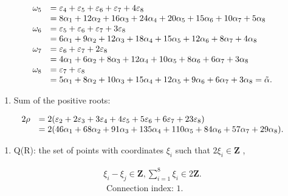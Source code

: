\[
\begin{array}{r l} \omega_ {5} & = \varepsilon_ {4} + \varepsilon_ {5} + \varepsilon_ {6} + \varepsilon_ {7} + 4 \varepsilon_ {8} \\ & = 8 \alpha_ {1} + 12 \alpha_ {2} + 16 \alpha_ {3} + 24 \alpha_ {4} + 20 \alpha_ {5} + 15 \alpha_ {6} + 10 \alpha_ {7} + 5 \alpha_ {8} \\ \omega_ {6} & = \varepsilon_ {5} + \varepsilon_ {6} + \varepsilon_ {7} + 3 \varepsilon_ {8} \\ & = 6 \alpha_ {1} + 9 \alpha_ {2} + 12 \alpha_ {3} + 18 \alpha_ {4} + 15 \alpha_ {5} + 12 \alpha_ {6} + 8 \alpha_ {7} + 4 \alpha_ {8} \\ \omega_ {7} & = \varepsilon_ {6} + \varepsilon_ {7} + 2 \varepsilon_ {8} \\ & = 4 \alpha_ {1} + 6 \alpha_ {2} + 8 \alpha_ {3} + 12 \alpha_ {4} + 10 \alpha_ {5} + 8 \alpha_ {6} + 6 \alpha_ {7} + 3 \alpha_ {8} \\ \omega_ {8} & = \varepsilon_ {7} + \varepsilon_ {8} \\ & = 5 \alpha_ {1} + 8 \alpha_ {2} + 10 \alpha_ {3} + 15 \alpha_ {4} + 12 \alpha_ {5} + 9 \alpha_ {6} + 6 \alpha_ {7} + 3 \alpha_ {8} = \tilde {\alpha}. \end{array}
\]

\begin{enumerate}
\def\labelenumi{(\Roman{enumi})}
\setcounter{enumi}{6}
\tightlist
\item
  Sum of the positive roots:
\end{enumerate}

\[
\begin{array}{r l} 2 \rho & = 2 (\varepsilon_ {2} + 2 \varepsilon_ {3} + 3 \varepsilon_ {4} + 4 \varepsilon_ {5} + 5 \varepsilon_ {6} + 6 \varepsilon_ {7} + 23 \varepsilon_ {8}) \\ & = 2 (46 \alpha_ {1} + 68 \alpha_ {2} + 91 \alpha_ {3} + 135 \alpha_ {4} + 110 \alpha_ {5} + 84 \alpha_ {6} + 57 \alpha_ {7} + 29 \alpha_ {8}). \end{array}
\]

\begin{enumerate}
\def\labelenumi{(\Roman{enumi})}
\setcounter{enumi}{7}
\tightlist
\item
  Q(R): the set of points with coordinates \(\xi_{i}\) such that \(2\xi_{i} \in \mathbf{Z}\) ,
\end{enumerate}

\[
\begin{array}{l} \xi_ {i} - \xi_ {j} \in \mathbf {Z}, \sum_ {i = 1} ^ {8} \xi_ {i} \in 2 \mathbf {Z}. \\ \text { Connection   index: } 1. \end{array}
\]

